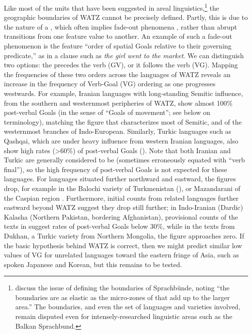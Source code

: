 \documentclass[output=paper,colorlinks,citecolor=brown,collectionchapter]{langscibook}
\begin{document}
Like most of the units that have been suggested in areal linguistics,\footnote{\citet[75]{friedman_reassessing_2017} discuss the issue of defining the boundaries of Sprachbünde, noting ``the boundaries are as elastic as the micro-zones of  that add up to the larger  area.'' The boundaries, and even the set of languages and varieties involved, remain disputed even for intensely-researched linguistic areas such as the Balkan Sprachbund.} the geographic boundaries of WATZ cannot be precisely defined. Partly, this is due to the nature of a , which often implies fade-out phenomena \citep{stilo_intersection_2012}, rather than abrupt transitions from one feature value to another. An example of such a fade-out phenomenon is the feature ``order of spatial Goals relative to their governing predicate,'' as in a clause such as \textit{the girl went to the market}. We can distinguish two options: the  precedes the verb (GV), or it follows the verb (VG). Mapping the frequencies of these two orders across the languages of WATZ reveals an increase in the frequency of Verb-Goal (VG) ordering as one progresses westwards. For example, Iranian languages with long-standing Semitic influence, from the southern and westernmost peripheries of WATZ, show almost 100\% post-verbal Goals (in the sense of ``Goals of movement''; see below on terminology), matching the figure that characterizes most of Semitic, and of the westernmost branches of Indo-European. Similarly, Turkic languages such as Qashqai, which are under heavy influence from western Iranian languages, also show high rates (>60\%) of post-verbal Goals (\citealt{haig_which_2023}). Note that both Iranian and Turkic are generally considered to be  (sometimes erroneously equated with ``verb final''), so the high frequency of post-verbal Goals is not expected for these languages. For  languages situated further northward and eastward, the figures drop, for example in the Balochi variety of Turkmenistan (), or Mazandarani of the Caspian region \citep{stilo_mazandarani_2022}. Furthermore, initial counts from related  languages further eastward beyond WATZ suggest they drop still further; in Indo-Iranian (Dardic) Kalasha (Northern Pakistan, bordering Afghanistan), provisional counts of the texts in \citet{petersen_kalasha_2015} suggest rates of post-verbal Goals below 30\%, while in the texts from Dukhan, a Turkic variety from Northern Mongolia, the figure approaches zero. If the basic hypothesis behind WATZ is correct, then we might predict similar low values of VG for unrelated  languages toward the eastern fringe of Asia, such as spoken Japanese and Korean, but this remains to be tested.
\end{document}
